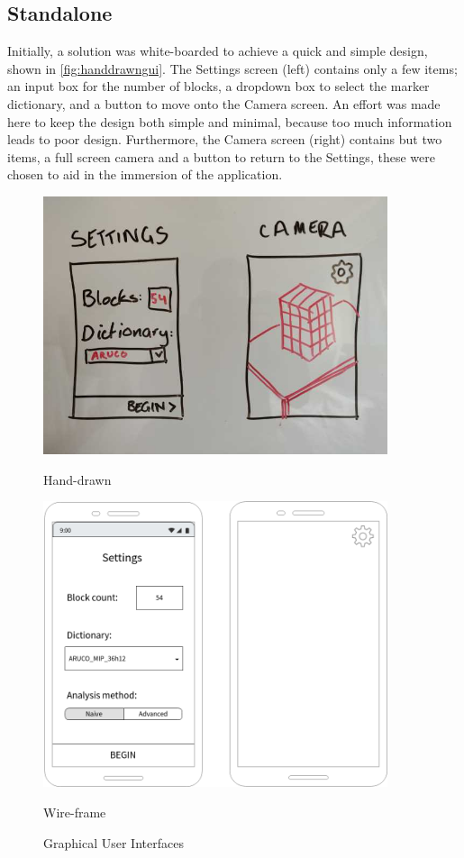 \subsection{Standalone}\label{sec:standalone}

Initially, a solution was white-boarded to achieve a quick and simple design, shown in \cref{fig:handdrawngui}. The Settings screen (left) contains only a few items; an input box for the number of blocks, a dropdown box to select the marker dictionary, and a button to move onto the Camera screen. An effort was made here to keep the design both simple and minimal, because too much information leads to poor design. Furthermore, the Camera screen (right) contains but two items, a full screen camera and a button to return to the Settings, these were chosen to aid in the immersion of the application.

\begin{figure}[ht]
\begin{minipage}{0.45\textwidth}
    \centering
    \includegraphics[width=0.9\textwidth]{images/design/gui}
    \caption{Hand-drawn}
    \label{fig:handdrawngui}
\end{minipage}\hfill
\begin{minipage}{0.45\textwidth}
    \centering
    \includegraphics[width=0.9\textwidth]{images/design/wireframe}
    \caption{Wire-frame}
    \label{fig:wireframe}
\end{minipage}
\caption{Graphical User Interfaces}
\label{fig:gui}
\end{figure}

